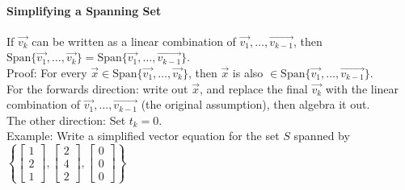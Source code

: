 \documentclass[10pt,letter]{article}
\begin{document}
\paragraph{Simplifying a Spanning Set} If $\vec{v_k}$ can be written as a linear combination of $\vec{v_1},\ldots,\vec{v_{k-1}}$, then $\text{Span}\{\vec{v_1},\ldots,\vec{v_k}\} = \text{Span}\{\vec{v_1},\ldots,\vec{v_{k-1}}\}$. \\ 
Proof: For every $\vec{x}\in\text{Span}\{\vec{v_1},\ldots,\vec{v_k}\}$, then $\vec{x}$ is also $\in\text{Span}\{\vec{v_1},\ldots,\vec{v_{k-1}}\}$. \\ 
For the forwards direction: write out $\vec{x}$, and replace the final $\vec{v_k}$ with the linear combination of $\vec{v_1},\ldots,\vec{v_{k-1}}$ (the original assumption), then algebra it out.\\ 
The other direction: Set $t_k=0$. \\ 
Example: Write a simplified vector equation for the set $S$ spanned by $\left\{\begin{bmatrix}1\\2\\1\end{bmatrix},\begin{bmatrix}2\\4\\2\end{bmatrix},\begin{bmatrix}0\\0\\0\end{bmatrix}\right\}$ \\ 
\end{document}
